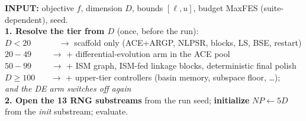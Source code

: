 \documentclass[11pt,a4paper]{article}
\begin{document}
\begin{tcolorbox}[breakable, colback=boxgrey, colframe=black!45, boxrule=0.4pt,
  arc=2pt, left=3.5mm, right=2.5mm, top=2mm, bottom=2mm]
{\small
\textbf{INPUT:} objective $f$, dimension $D$, bounds $[\ell,u]$, budget MaxFES
(suite-dependent), seed.\\[3pt]

\textbf{1. Resolve the tier from $D$} (once, before the run):\\
\hspace*{4mm}$D<20$ \ \ \ \ \ \ $\rightarrow$ scaffold only (ACE+ARGP, NLPSR, blocks, LS, BSE, restart)\\
\hspace*{4mm}$20\!-\!49$ \ \ \ \ $\rightarrow$ + differential-evolution arm in the ACE pool\\
\hspace*{4mm}$50\!-\!99$ \ \ \ \ $\rightarrow$ + ISM graph, ISM-fed linkage blocks, deterministic final polish\\
\hspace*{4mm}$D\geq100$ \ \ \ $\rightarrow$ + upper-tier controllers (basin memory, subspace floor, \ldots);\\
\hspace*{13mm}\emph{and the DE arm switches off again}\\[3pt]

\textbf{2. Open the 13 RNG substreams} from the run seed; \textbf{initialize}
$NP \leftarrow 5D$ from the \textit{init} substream; evaluate.\\[3pt]

}
\end{tcolorbox}
\end{document}
